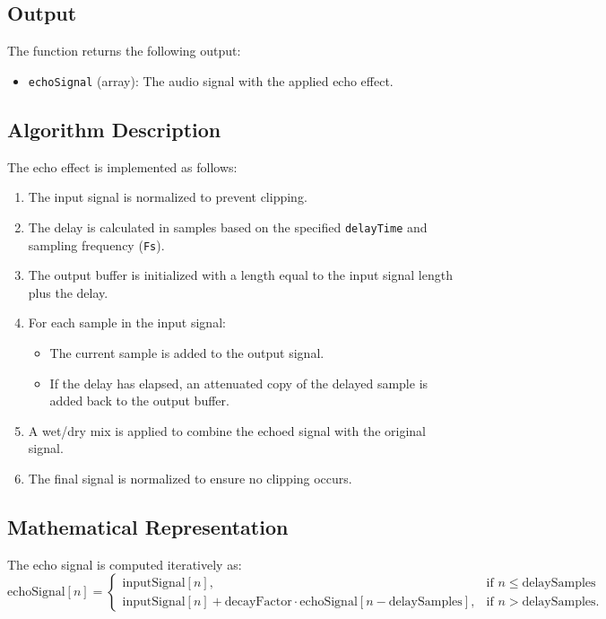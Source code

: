 \documentclass{article}
\begin{document}
\subsection{Output}
The function returns the following output:
\begin{itemize}
    \item \texttt{echoSignal} (array): The audio signal with the applied echo effect.
\end{itemize}

\subsection{Algorithm Description}
The echo effect is implemented as follows:
\begin{enumerate}
    \item The input signal is normalized to prevent clipping.
    \item The delay is calculated in samples based on the specified \texttt{delayTime} and sampling frequency (\texttt{Fs}).
    \item The output buffer is initialized with a length equal to the input signal length plus the delay.
    \item For each sample in the input signal:
    \begin{itemize}
        \item The current sample is added to the output signal.
        \item If the delay has elapsed, an attenuated copy of the delayed sample is added back to the output buffer.
    \end{itemize}
    \item A wet/dry mix is applied to combine the echoed signal with the original signal.
    \item The final signal is normalized to ensure no clipping occurs.
\end{enumerate}

\subsection{Mathematical Representation}
The echo signal is computed iteratively as:
\[
\text{echoSignal}[n] =
\begin{cases}
\text{inputSignal}[n], & \text{if } n \leq \text{delaySamples} \\
\text{inputSignal}[n] + \text{decayFactor} \cdot \text{echoSignal}[n - \text{delaySamples}], & \text{if } n > \text{delaySamples}.
\end{cases}
\]
\end{document}
